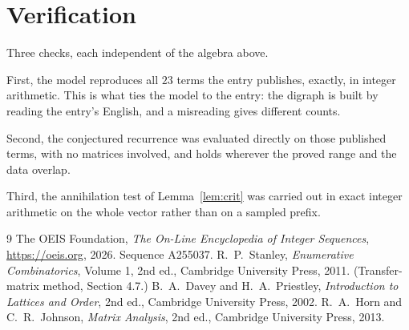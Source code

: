 \documentclass[11pt,a4paper]{article}
\theoremstyle{plain}
\theoremstyle{definition}
\begin{document}
\section{Verification}

Three checks, each independent of the algebra above.

First, the model reproduces all $23$ terms the entry publishes, exactly, in integer
arithmetic. This is what ties the model to the entry: the digraph is built by reading the
entry's English, and a misreading gives different counts.

Second, the conjectured recurrence was evaluated directly on those published terms, with no
matrices involved, and holds wherever the proved range and the data overlap.

Third, the annihilation test of Lemma~\ref{lem:crit} was carried out in exact integer
arithmetic on the whole vector rather than on a sampled prefix.

\begin{thebibliography}{9}
 The OEIS Foundation, \emph{The On-Line Encyclopedia of Integer
Sequences}, \url{https://oeis.org}, 2026. Sequence A255037.
 R.~P.~Stanley, \emph{Enumerative Combinatorics}, Volume 1, 2nd ed.,
Cambridge University Press, 2011. (Transfer-matrix method, Section 4.7.)
 B.~A.~Davey and H.~A.~Priestley, \emph{Introduction to Lattices and
Order}, 2nd ed., Cambridge University Press, 2002.
 R.~A.~Horn and C.~R.~Johnson, \emph{Matrix Analysis}, 2nd ed., Cambridge
University Press, 2013.
\end{thebibliography}
\end{document}
